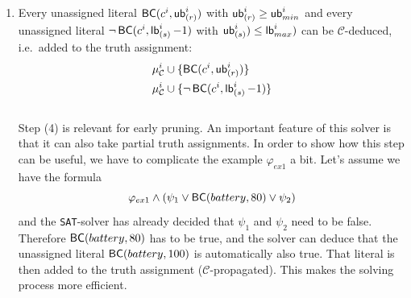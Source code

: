 \documentclass{amsart}
\theoremstyle{definition}
\theoremstyle{remark}
\numberwithin{equation}{section}
\def\C{$\mathcal{C}$}
\def\sat{\texttt{SAT}}
\begin{document}
    \begin{enumerate}[resume]
      \item Every unassigned literal $\operatorname{\sf BC \rm}(c^i, \operatorname{\sf ub \rm}_{(r)}^i)$ with $\operatorname{\sf ub \rm}_{(r)}^i \geq \operatorname{\sf ub \rm}_{min}^i$ and every unassigned literal $\neg \operatorname{\sf BC \rm}(c^i, \operatorname{\sf lb \rm}_{(s)}^i - 1)$ with $\operatorname{\sf ub \rm}_{(s)}^i) \leq \operatorname{\sf lb \rm}_{max}^i)$ can be \C{}-deduced, i.e.\ added to the truth assignment:
      \begin{equation*}
        \begin{split}
          \mu_{\mathcal{C}}^i &\cup \{\operatorname{\sf BC \rm}(c^i, \operatorname{\sf ub \rm}_{(r)}^i)\} \\
          \mu_{\mathcal{C}}^i &\cup \{\neg \operatorname{\sf BC \rm}(c^i, \operatorname{\sf lb \rm}_{(s)}^{i} - 1)\}
        \end{split}
      \end{equation*} \\
      Step (4) is relevant for early pruning.
      An important feature of this solver is that it can also take partial truth assignments.
      In order to show how this step can be useful, we have to complicate the example $\varphi_{ex1}$ a bit. Let's assume we have the formula 
      \begin{equation*}
        \varphi_{ex1} \land (\psi_1 \lor \operatorname{\sf BC \rm}(battery, 80) \lor \psi_2)
      \end{equation*}
      and the \sat{}-solver has already decided that $\psi_1$ and $\psi_2$ need to be false.
      Therefore $\operatorname{\sf BC \rm}(battery, 80)$ has to be true, and the solver can deduce that the unassigned literal $\operatorname{\sf BC \rm}(battery, 100)$ is automatically also true.
      That literal is then added to the truth assignment (\C{}-propagated).
      This makes the solving process more efficient. \\


\end{enumerate}
\end{document}
